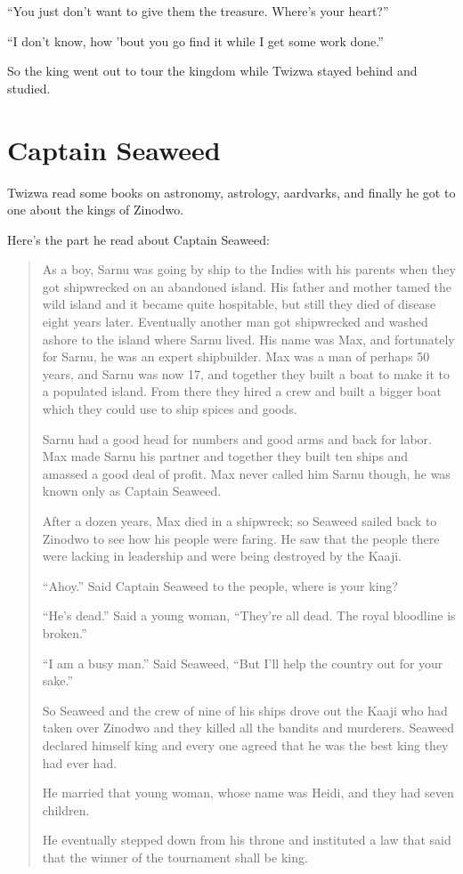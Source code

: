 ``You just don't want to give them the treasure. Where's your heart?''

``I don't know, how 'bout you go find it while I get some work done.''

So the king went out to tour the kingdom while Twizwa stayed behind and studied.

\section{Captain Seaweed}

Twizwa read some books on astronomy, astrology, aardvarks, and finally he got to one about the kings of Zinodwo.

Here's the part he read about Captain Seaweed:

\begin{quote}

As a boy, Sarnu was going by ship to the Indies with his parents when they got shipwrecked on an abandoned island.
His father and mother tamed the wild island and it became quite hospitable, but still they died of disease eight years later.
Eventually another man got shipwrecked and washed ashore to the island where Sarnu lived.
His name was Max, and fortunately for Sarnu, he was an expert shipbuilder.
Max was a man of perhaps 50 years, and Sarnu was now 17, and together they built a boat to make it to a populated island.
From there they hired a crew and built a bigger boat which they could use to ship spices and goods.

Sarnu had a good head for numbers and good arms and back for labor.
Max made Sarnu his partner and together they built ten ships and amassed a good deal of profit.
Max never called him Sarnu though, he was known only as Captain Seaweed.

After a dozen years, Max died in a shipwreck; so Seaweed sailed back to Zinodwo to see how his people were faring.
He saw that the people there were lacking in leadership and were being destroyed by the Kaaji.

``Ahoy.'' Said Captain Seaweed to the people, where is your king?

``He's dead.'' Said a young woman, ``They're all dead. The royal bloodline is broken.''

``I am a busy man.'' Said Seaweed, ``But I'll help the country out for your sake.''

So Seaweed and the crew of nine of his ships drove out the Kaaji who had taken over Zinodwo and they killed all the bandits and murderers. Seaweed declared himself king and every one agreed that he was the best king they had ever had.

He married that young woman, whose name was Heidi, and they had seven children.

He eventually stepped down from his throne and instituted a law that said that the winner of the tournament shall be king.

\end{quote}

